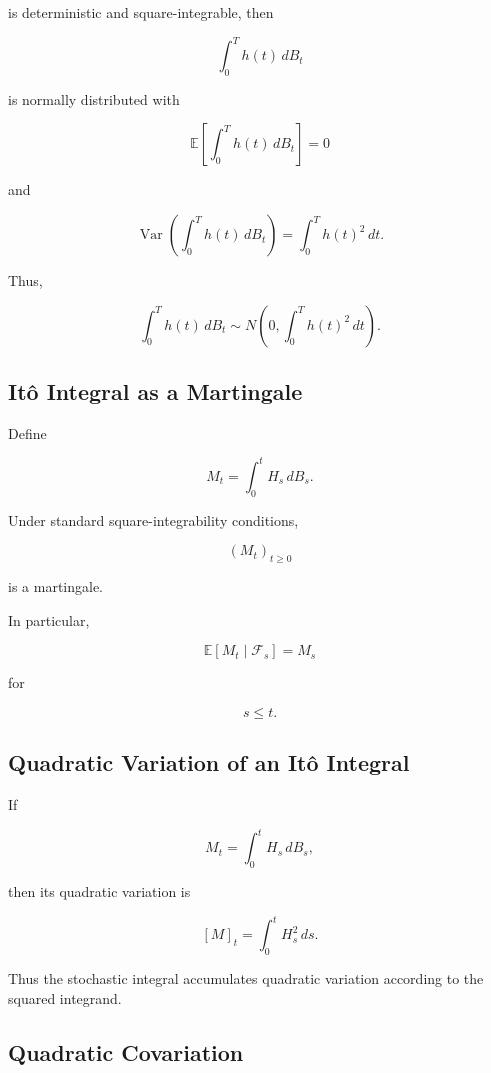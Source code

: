 is deterministic and square-integrable, then

\[
\boxed{
\int_0^T
h(t)\,dB_t
}
\]

is normally distributed with

\[
\mathbb{E}
\left[
\int_0^T
h(t)\,dB_t
\right]
=
0
\]

and

\[
\operatorname{Var}
\left(
\int_0^T
h(t)\,dB_t
\right)
=
\int_0^T
h(t)^2\,dt.
\]

Thus,

\[
\boxed{
\int_0^T
h(t)\,dB_t
\sim
N
\left(
0,
\int_0^T h(t)^2\,dt
\right).
}
\]

\subsection{It\^o Integral as a Martingale}
\label{subsec:ito-integral-martingale}

Define

\[
M_t
=
\int_0^t
H_s\,dB_s.
\]

Under standard square-integrability conditions,

\[
\boxed{
(M_t)_{t\geq0}
}
\]

is a martingale.

In particular,

\[
\boxed{
\mathbb{E}[M_t\mid\mathcal{F}_s]
=
M_s
}
\]

for

\[
s\leq t.
\]

\subsection{Quadratic Variation of an It\^o Integral}
\label{subsec:qv-ito-integral}

If

\[
M_t
=
\int_0^t
H_s\,dB_s,
\]

then its quadratic variation is

\[
\boxed{
[M]_t
=
\int_0^t
H_s^2\,ds.
}
\]

Thus the stochastic integral accumulates quadratic variation according
to the squared integrand.

\subsection{Quadratic Covariation}
\label{subsec:quadratic-covariation}

